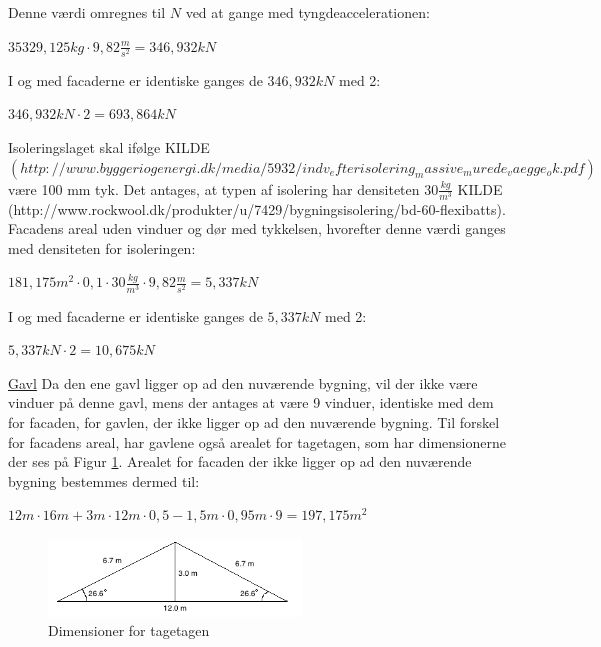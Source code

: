 Denne værdi omregnes til $N$ ved at gange med tyngdeaccelerationen:
\begin{center}
	$35329,\!125 kg\cdot 9,\!82 \frac{m}{s^2}=346,\!932 kN$
\end{center}

I og med facaderne er identiske ganges de $346,\!932 kN$ med 2:
\begin{center}
	$346,\!932 kN\cdot 2=693,\!864 kN$
\end{center}

Isoleringslaget skal ifølge KILDE$(http://www.byggeriogenergi.dk/media/5932/indv_efterisolering_massive_murede_vaegge_ok.pdf)$ være 100 mm tyk. Det antages, at typen af isolering har densiteten $30 \frac{kg}{m^3}$ KILDE (http://www.rockwool.dk/produkter/u/7429/bygningsisolering/bd-60-flexibatts).
\newline \indent{     }  Facadens areal uden vinduer og dør med tykkelsen, hvorefter denne værdi ganges med densiteten for isoleringen:
\begin{center}
	$181,\!175 m^2\cdot 0,1 \cdot 30 \frac{kg}{m^3}\cdot 9,\!82 \frac{m}{s^2}=5,\!337 kN$
\end{center}

I og med facaderne er identiske ganges de $5,\!337 kN$ med 2:
\begin{center}
	$5,\!337 kN\cdot 2=10,\!675 kN$
\end{center}

\underline{Gavl}
\newline
Da den ene gavl ligger op ad den nuværende bygning, vil der ikke være vinduer på denne gavl, mens der antages at være 9 vinduer, identiske med dem for facaden, for gavlen, der ikke ligger op ad den nuværende bygning. Til forskel for facadens areal, har gavlene også arealet for tagetagen, som har dimensionerne der ses på Figur \ref{fig:tagetage}. Arealet for facaden der ikke ligger op ad den nuværende bygning bestemmes dermed til:
\begin{center}
	$12 m\cdot 16 m + 3 m\cdot 12 m \cdot 0,\!5 - 1,\!5 m\cdot 0,\!95 m \cdot 9=197,\!175 m^2$
\end{center}

\begin{figure}[htbp]
	\centering
	\includegraphics[width=0.6\textwidth]{billeder/Tagmedvinkel.png}
	\caption{Dimensioner for tagetagen}
	\label{fig:tagetage}
\end{figure}

